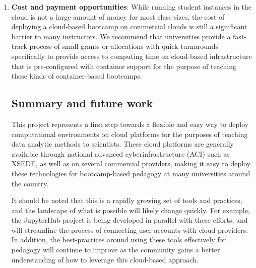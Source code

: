 \begin{enumerate}
\item {\bf Cost and payment opportunities}: While running student instances in the cloud
is not a large amount of money for most class sizes, the
cost of deploying a cloud-based bootcamp on commercial clouds is still a
significant barrier to many instructors. We recommend that universities provide
a fast-track process of small grants or allocations with quick turnarounds
specifically to provide access to computing time on cloud-based infrastructure
that is pre-configured with container support for the purpose of teaching
these kinds of container-based bootcamps.

\subsection{Summary and future work}

This project represents a first step towards a flexible and easy way to deploy
computational environments on cloud platforms for the purposes of teaching
data analytic methods to scientists. These cloud platforms are generally available
through national advanced cyberinfrastructure (ACI) such as XSEDE, as well as on several
commercial providers, making it easy to deploy these technologies for
bootcamp-based pedagogy at many universities around the country.

It should be noted that this is a rapidly growing set of tools and practices,
and the landscape of what is possible will likely change quickly. For example,
the JupyterHub project\cite{perez2015project} is being developed in parallel with
these efforts, and will streamline the process of connecting user
accounts with cloud providers. In addition, the best-practices around using
these tools effectively for pedagogy will continue to improve as the community
gains a better understanding of how to leverage this cloud-based approach.

\end{enumerate}
